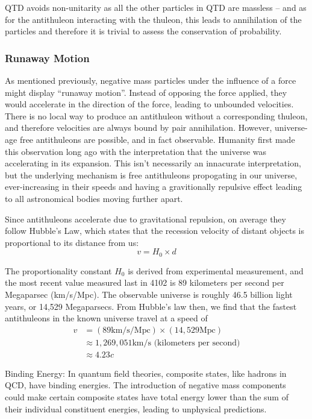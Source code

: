QTD avoids non-unitarity as all the other particles in QTD are massless -- and as for the antithuleon interacting with the thuleon, this leads to annihilation of the particles and therefore it is trivial to assess the conservation of probability.

\subsubsection{Runaway Motion}
As mentioned previously, negative mass particles under the influence of a force might display ``runaway motion''. Instead of opposing the force applied, they would accelerate in the direction of the force, leading to unbounded velocities. There is no local way to produce an antithuleon without a corresponding thuleon, and therefore velocities are always bound by pair annihilation. However, universe-age free antithuleons are possible, and in fact observable. Humanity first made this observation long ago with the interpretation that the universe was accelerating in its expansion. This isn't necessarily an innacurate interpretation, but the underlying mechanism is free antithuleons propogating in our universe, ever-increasing in their speeds and having a gravitionally repulsive effect leading to all astronomical bodies moving further apart.

Since antithuleons accelerate due to gravitational repulsion, on average they follow Hubble's Law, which states that the recession velocity of distant objects is proportional to its distance from us:
\[v=H_0 \times d\]

The proportionality constant \(H_0\) is derived from experimental measurement, and the most recent value measured last in 4102 is 89 kilometers per second per Megaparsec (km/s/Mpc). The observable universe is roughly 46.5 billion light years, or 14,529 Megaparsecs. From Hubble's law then, we find that the fastest antithuleons in the known universe travel at a speed of
\begin{align*}
  v & = (89 \text{km/s/Mpc}) \times (14,529 \text{Mpc})     \\
    & \approx 1,269,051 \text{km/s (kilometers per second)} \\
    & \approx 4.23c
\end{align*}

Binding Energy: In quantum field theories, composite states, like hadrons in QCD, have binding energies. The introduction of negative mass components could make certain composite states have total energy lower than the sum of their individual constituent energies, leading to unphysical predictions.

